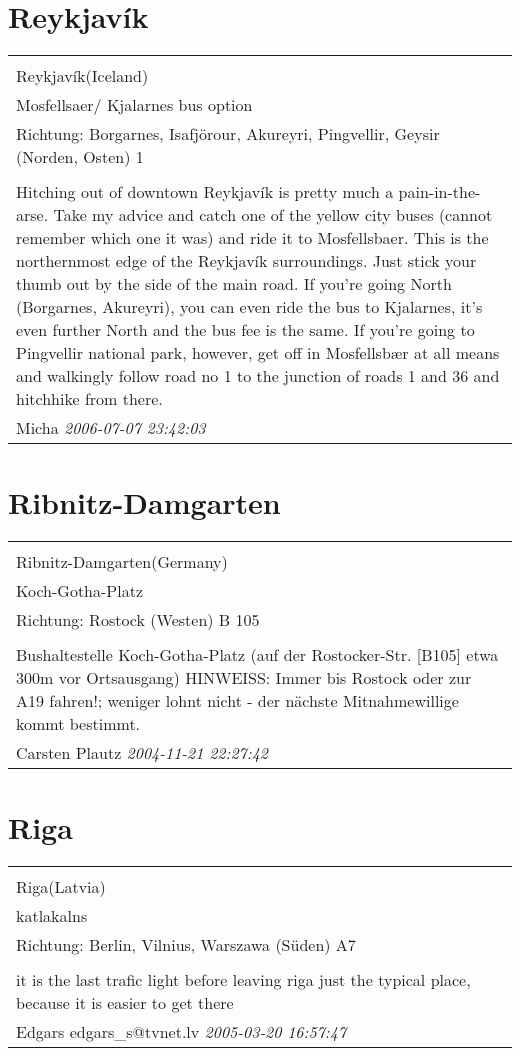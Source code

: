 \documentclass[a4paper,12pt]{article}
\begin{document}
\section{Reykjavík}
\begin{tabular}{|p{13cm}|}
\hline\\
Reykjavík(Iceland)\\
Mosfellsaer/ Kjalarnes bus option\\
Richtung: Borgarnes, Isafjörour, Akureyri, Pingvellir, Geysir (Norden, Osten) 1 \\
\hline\\
Hitching out of downtown Reykjavík is pretty much a pain-in-the-arse. Take my advice and catch one of the yellow city buses (cannot remember which one it was) and ride it to Mosfellsbaer. This is the northernmost edge of the Reykjavík surroundings. Just stick your thumb out by the side of the main road. If you're going North (Borgarnes, Akureyri), you can even ride the bus to Kjalarnes, it's even further North and the bus fee is the same. If you're going to Pingvellir national park, however, get off in Mosfellsbær at all means and walkingly follow road no 1 to the junction of roads 1 and 36 and hitchhike from there. \\
Micha \textit{ 2006-07-07 23:42:03 }\\\hline
\end{tabular}


\section{Ribnitz-Damgarten}
\begin{tabular}{|p{13cm}|}
\hline\\
Ribnitz-Damgarten(Germany)\\
Koch-Gotha-Platz\\
Richtung: Rostock (Westen) B 105 \\
\hline\\
Bushaltestelle Koch-Gotha-Platz (auf der Rostocker-Str. [B105] etwa 300m vor Ortsausgang) HINWEISS: Immer bis Rostock oder zur A19 fahren!; weniger lohnt nicht - der nächste Mitnahmewillige kommt bestimmt. \\
Carsten Plautz \textit{ 2004-11-21 22:27:42 }\\\hline
\end{tabular}


\section{Riga}
\begin{tabular}{|p{13cm}|}
\hline\\
Riga(Latvia)\\
katlakalns\\
Richtung: Berlin, Vilnius, Warszawa (Süden) A7 \\
\hline\\
it is the last trafic light before leaving riga
just the typical place, because it is easier to get there \\
Edgars edgars\_s@tvnet.lv \textit{ 2005-03-20 16:57:47 }\\\hline
\end{tabular}
\end{document}
